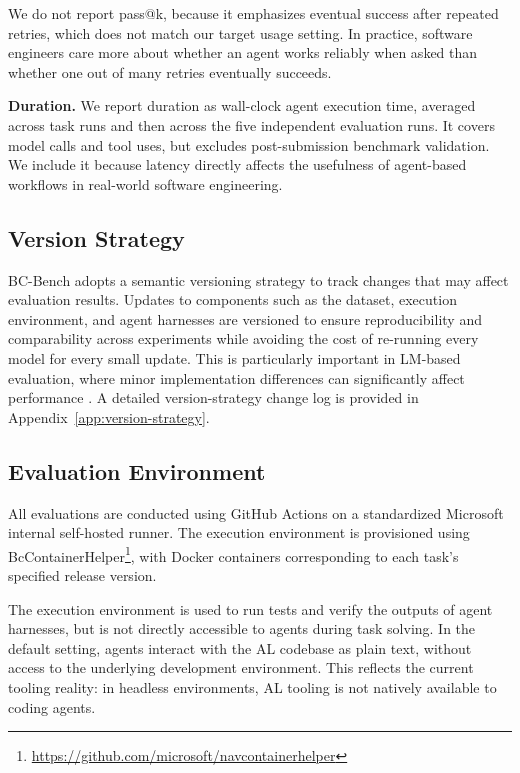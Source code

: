 \documentclass{article}
\begin{document}
We do not report pass@k, because it emphasizes eventual success after repeated retries, which does not match our target usage setting. In practice, software engineers care more about whether an agent works reliably when asked than whether one out of many retries eventually succeeds.

\textbf{Duration.} We report duration as wall-clock agent execution time, averaged across task runs and then across the five independent evaluation runs. It covers model calls and tool uses, but excludes post-submission benchmark validation. We include it because latency directly affects the usefulness of agent-based workflows in real-world software engineering.

\subsection{Version Strategy}
\label{sec:version-strategy}

BC-Bench adopts a semantic versioning strategy to track changes that may affect evaluation results. Updates to components such as the dataset, execution environment, and agent harnesses are versioned to ensure reproducibility and comparability across experiments while avoiding the cost of re-running every model for every small update. This is particularly important in LM-based evaluation, where minor implementation differences can significantly affect performance \cite{biderman_lessons_2025}. A detailed version-strategy change log is provided in Appendix~\ref{app:version-strategy}.

\subsection{Evaluation Environment}

All evaluations are conducted using GitHub Actions on a standardized Microsoft internal self-hosted runner. The execution environment is provisioned using BcContainerHelper\footnote{\href{https://github.com/microsoft/navcontainerhelper}{https://github.com/microsoft/navcontainerhelper}}, with Docker containers corresponding to each task's specified release version.

The execution environment is used to run tests and verify the outputs of agent harnesses, but is not directly accessible to agents during task solving. In the default setting, agents interact with the AL codebase as plain text, without access to the underlying development environment. This reflects the current tooling reality: in headless environments, AL tooling is not natively available to coding agents.
\end{document}
